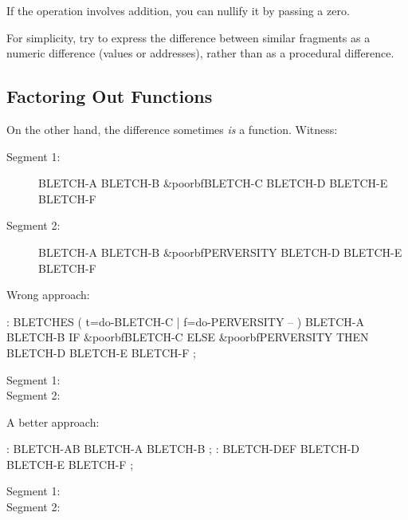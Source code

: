 If the operation involves addition, you can nullify it by passing a
zero.

\begin{tip}
For simplicity, try to express the difference between similar
fragments as a numeric difference (values or addresses), rather than
as a procedural difference.
\end{tip}

\subsection{Factoring Out Functions}
On the other hand, the difference sometimes \emph{is} a function. Witness:

\begin{description}
\item[Segment 1:]
\begin{Code}[commandchars=\&\{\}]
BLETCH-A  BLETCH-B  &poorbf{BLETCH-C}
         BLETCH-D  BLETCH-E  BLETCH-F
\end{Code}
\item[Segment 2:]
\begin{Code}[commandchars=\&\{\}]
BLETCH-A  BLETCH-B  &poorbf{PERVERSITY}
         BLETCH-D  BLETCH-E  BLETCH-F
\end{Code}
\end{description}

\noindent Wrong approach:

\begin{Code}[commandchars=\&\{\}]
: BLETCHES  ( t=do-BLETCH-C | f=do-PERVERSITY -- ) 
   BLETCH-A  BLETCH-B  IF &poorbf{BLETCH-C} ELSE &poorbf{PERVERSITY}
      THEN BLETCH-D BLETCH-E BLETCH-F ;
\end{Code}

\begin{description}
\item[Segment 1:] 
\item[Segment 2:] 
\end{description}

\noindent A better approach:

\begin{Code}
: BLETCH-AB   BLETCH-A BLETCH-B ;
: BLETCH-DEF   BLETCH-D BLETCH-E BLETCH-F ;
\end{Code}

\begin{description}
\item[Segment 1:] 
\item[Segment 2:] 
\end{description}

